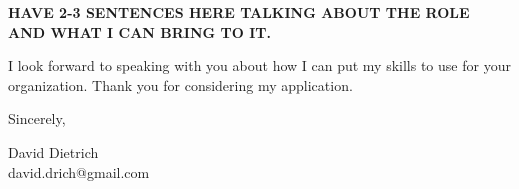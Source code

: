 \documentclass[11pt,a4]{article}
\begin{document}
\textbf{HAVE 2-3 SENTENCES HERE TALKING ABOUT THE ROLE AND WHAT I CAN BRING TO IT.}

I look forward to speaking with you about how I can put my skills to use for your organization. Thank you for considering my application. \par


\vspace{0.5cm}
\raggedright
Sincerely, \\
\vspace{0.2cm}
\raggedright
David Dietrich \\ david.drich@gmail.com
\end{document}
